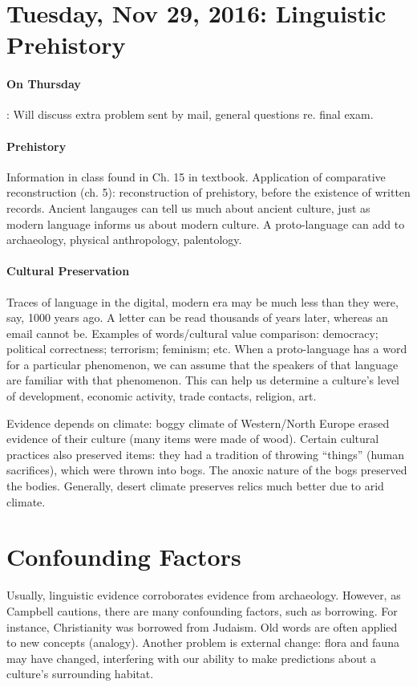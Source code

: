 \documentclass{exam}
\begin{document}
\section*{Tuesday, Nov 29, 2016: Linguistic Prehistory}
\paragraph{On Thursday}: Will discuss extra problem sent by mail, general questions re. final exam.

\paragraph{Prehistory} Information in class found in Ch. 15 in textbook.
Application of comparative reconstruction (ch. 5): reconstruction of prehistory, before the existence of written records. 
Ancient langauges can tell us much about ancient culture, just as modern language informs us about modern culture.
A proto-language can add to archaeology, physical anthropology, palentology.  

\paragraph{Cultural Preservation} Traces of language in the digital, modern era may be much less than they were, say, 1000 years ago. 
A letter can be read thousands of years later, whereas an email cannot be. 
Examples of words/cultural value comparison: democracy; political correctness; terrorism; feminism; etc.
When a proto-language has a word for a particular phenomenon, we can assume that the speakers of that language are familiar with that phenomenon. 
This can help us determine a culture's level of development, economic activity, trade contacts, religion, art. 

Evidence depends on climate: boggy climate of Western/North Europe erased evidence of their culture (many items were made of wood). 
Certain cultural practices also preserved items: they had a tradition of throwing ``things'' (human sacrifices), which were thrown into bogs.
The anoxic nature of the bogs preserved the bodies. 
Generally, desert climate preserves relics much better due to arid climate.

\section{Confounding Factors}Usually, linguistic evidence corroborates evidence from archaeology.
However, as Campbell cautions, there are many confounding factors, such as borrowing. 
For instance, Christianity was borrowed from Judaism. 
Old words are often applied to new concepts (analogy). 
Another problem is external change: flora and fauna may have changed, interfering with our ability to make predictions about a culture's surrounding habitat. 
\end{document}

